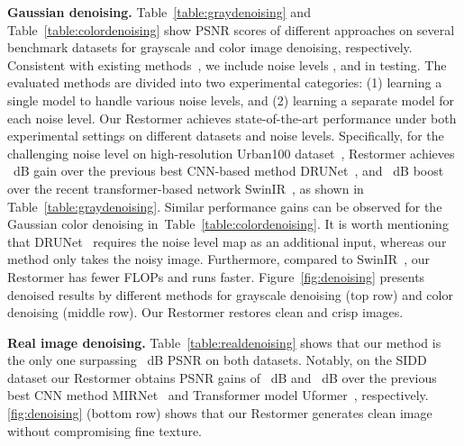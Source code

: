 \documentclass[10pt,twocolumn,letterpaper]{article}
\def\xnet{Restormer\xspace}
\begin{document}
\vspace{0.2em}
\noindent \textbf{Gaussian denoising.} 
Table~\ref{table:graydenoising} and Table~\ref{table:colordenoising} show PSNR scores of different approaches on several benchmark datasets for grayscale and color image denoising, respectively. 
Consistent with existing methods~\cite{zhang2021DPIR,liang2021swinir}, we include noise levels ,  and  in testing.
The evaluated methods are divided into two experimental categories: (1) learning a single model to handle various noise levels, and (2) learning a separate model for each noise level. Our \xnet achieves state-of-the-art performance under both experimental settings on different datasets and noise levels.
Specifically, for the challenging noise level  on high-resolution Urban100 dataset~\cite{huang2015single_urban100}, \xnet achieves ~dB gain over the previous best CNN-based method DRUNet~\cite{zhang2021DPIR}, and ~dB boost over the recent transformer-based network SwinIR~\cite{liang2021swinir}, as shown in Table~\ref{table:graydenoising}.
Similar performance gains can be observed for the Gaussian color denoising in~Table~\ref{table:colordenoising}. 
It is worth mentioning that DRUNet~\cite{zhang2021DPIR} requires {the} noise level map as an additional input, whereas our method only takes the noisy image. Furthermore, compared to SwinIR~\cite{liang2021swinir}, our \xnet has  fewer FLOPs and runs  faster. Figure~\ref{fig:denoising} presents denoised results by different methods for grayscale denoising (top row) and color denoising (middle row). Our \xnet restores clean and crisp images.

\vspace{0.2em}
\noindent \textbf{Real image denoising.}
Table~\ref{table:realdenoising} shows that our method is the only one surpassing ~dB PSNR on both datasets.
Notably, on the SIDD dataset our \xnet obtains PSNR gains of ~dB and ~dB over the previous best CNN method MIRNet~\cite{zamir2020mirnet} and Transformer model Uformer~\cite{wang2021uformer}, respectively. \cref{fig:denoising} (bottom row) shows that our \xnet generates clean image without compromising fine texture.
\end{document}
